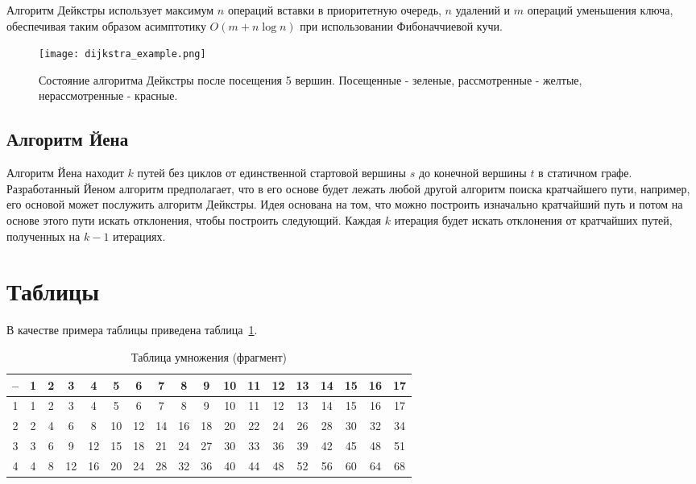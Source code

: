 Алгоритм Дейкстры использует максимум $n$ операций вставки в приоритетную очередь, $n$ удалений и $m$ операций уменьшения ключа, обеспечивая таким образом асимптотику $O(m + n \log n)$ при использовании Фибоначчиевой кучи.

\begin{figure}[!h]
	\centering
	\texttt{[image: dijkstra\_example.png]}
	\caption{Состояние алгоритма Дейкстры после посещения 5 вершин. Посещенные - зеленые, рассмотренные - желтые, нерассмотренные - красные.}\label{fig1}
\end{figure}


\subsection{Алгоритм Йена}
Алгоритм Йена находит $k$ путей без циклов от единственной стартовой вершины $s$ до конечной вершины $t$ в статичном графе. Разработанный Йеном алгоритм предполагает, что в его основе будет лежать любой другой алгоритм поиска кратчайшего пути, например, его основой может послужить алгоритм Дейкстры. Идея основана на том, что можно построить изначально кратчайший путь и потом на основе этого пути искать отклонения, чтобы построить следующий. Каждая $k$ итерация будет искать отклонения от кратчайших путей, полученных на $k-1$ итерациях.

\section{Таблицы}

В качестве примера таблицы приведена таблица~\ref{tab1}.

\begin{table}[!h]
\caption{Таблица умножения (фрагмент)}\label{tab1}
\centering
\begin{tabular}{|*{18}{c|}}\hline
-- & 1 & 2 & 3 & 4 & 5 & 6 & 7 & 8 & 9 & 10 & 11 & 12 & 13 & 14 & 15 & 16 & 17 \\\hline
1  & 1 & 2 & 3 & 4 & 5 & 6 & 7 & 8 & 9 & 10 & 11 & 12 & 13 & 14 & 15 & 16 & 17 \\\hline
2  & 2 & 4 & 6 & 8 & 10 & 12 & 14 & 16 & 18 & 20 & 22 & 24 & 26 & 28 & 30 & 32 & 34 \\\hline
3  & 3 & 6 & 9 & 12 & 15 & 18 & 21 & 24 & 27 & 30 & 33 & 36 & 39 & 42 & 45 & 48 & 51 \\\hline
4  & 4 & 8 & 12 & 16 & 20 & 24 & 28 & 32 & 36 & 40 & 44 & 48 & 52 & 56 & 60 & 64 & 68 \\\hline
\end{tabular}
\end{table}

